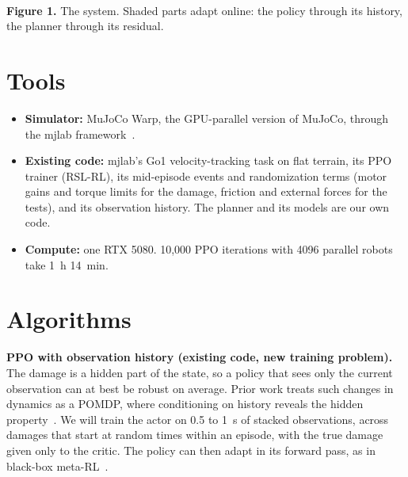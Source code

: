 \documentclass[10pt]{article}
\begin{document}
\begin{center}
\\[3pt]
  {\small\textbf{Figure 1.} The system. Shaded parts adapt online: the policy
  through its history, the planner through its residual.}
\end{center}

\section{Tools}

\begin{itemize}
  \item \textbf{Simulator:} MuJoCo Warp, the GPU-parallel version of MuJoCo,
    through the mjlab framework~\cite{mjlab}.
  \item \textbf{Existing code:} mjlab's Go1 velocity-tracking task on flat
    terrain, its PPO trainer (RSL-RL), its mid-episode events and
    randomization terms (motor gains and torque limits for the damage,
    friction and external forces for the tests), and its observation history.
    The planner and its models are our own code.
  \item \textbf{Compute:} one RTX 5080. 10,000 PPO iterations with 4096
    parallel robots take 1~h 14~min.
\end{itemize}

\section{Algorithms}

\textbf{PPO with observation history (existing code, new training problem).}
The damage is a hidden part of the state, so a policy that sees only the
current observation can at best be robust on average. Prior work treats such
changes in dynamics as a POMDP, where conditioning on history reveals the hidden
property~\cite{ni2022recurrent, locoformer}. We will train the actor
on 0.5 to 1~s of stacked observations, across damages that start at random
times within an episode, with the true damage given only to the critic. The
policy can then adapt in its forward pass, as in black-box
meta-RL~\cite{rl2}.
\end{document}
